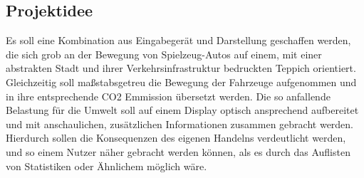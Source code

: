 \documentclass[.../Dokumentation.tex]{subfiles}
\begin{document}
\subsection{Projektidee}\label{sec-intr-idea}
Es soll eine Kombination aus Eingabegerät und Darstellung geschaffen werden, 
die sich grob an der Bewegung von Spielzeug-Autos auf einem, 
mit einer abstrakten Stadt und ihrer Verkehrsinfrastruktur bedruckten Teppich 
orientiert. Gleichzeitig soll maßstabsgetreu die Bewegung der Fahrzeuge 
aufgenommen und in ihre entsprechende CO2 Emmission übersetzt werden. 
Die so anfallende Belastung für die Umwelt soll auf einem Display 
optisch ansprechend aufbereitet und mit anschaulichen, zusätzlichen 
Informationen zusammen gebracht werden. 
Hierdurch sollen die Konsequenzen des eigenen Handelns verdeutlicht werden, 
und so einem Nutzer näher gebracht werden können, als es durch das 
Auflisten von Statistiken oder Ähnlichem möglich wäre.
\end{document}
